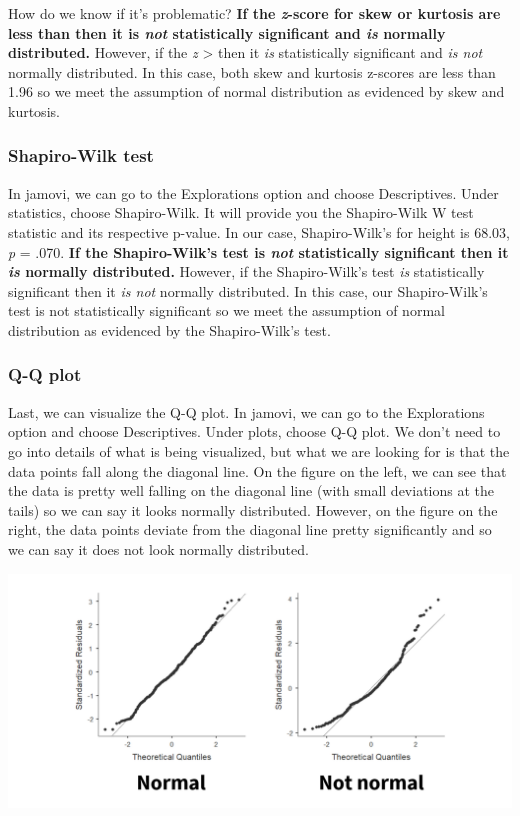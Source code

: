 \documentclass[
]{book}
\begin{document}
How do we know if it's problematic? \textbf{If the \emph{z}-score for skew or kurtosis are less than \textbar{} then it is \emph{not} statistically significant and \emph{is} normally distributed.} However, if the \emph{z} \textgreater{} \textbar{} then it \emph{is} statistically significant and \emph{is not} normally distributed. In this case, both skew and kurtosis z-scores are less than 1.96 so we meet the assumption of normal distribution as evidenced by skew and kurtosis.

\hypertarget{shapiro-wilk-test}{%
\subsubsection{Shapiro-Wilk test}\label{shapiro-wilk-test}}

In jamovi, we can go to the Explorations option and choose Descriptives. Under statistics, choose Shapiro-Wilk. It will provide you the Shapiro-Wilk W test statistic and its respective p-value. In our case, Shapiro-Wilk's for height is 68.03, \emph{p} = .070. \textbf{If the Shapiro-Wilk's test is \emph{not} statistically significant then it \emph{is} normally distributed.} However, if the Shapiro-Wilk's test \emph{is} statistically significant then it \emph{is not} normally distributed. In this case, our Shapiro-Wilk's test is not statistically significant so we meet the assumption of normal distribution as evidenced by the Shapiro-Wilk's test.

\hypertarget{q-q-plot}{%
\subsubsection{Q-Q plot}\label{q-q-plot}}

Last, we can visualize the Q-Q plot. In jamovi, we can go to the Explorations option and choose Descriptives. Under plots, choose Q-Q plot. We don't need to go into details of what is being visualized, but what we are looking for is that the data points fall along the diagonal line. On the figure on the left, we can see that the data is pretty well falling on the diagonal line (with small deviations at the tails) so we can say it looks normally distributed. However, on the figure on the right, the data points deviate from the diagonal line pretty significantly and so we can say it does not look normally distributed.

\includegraphics{images/06-inferential/qqplot.png}
\end{document}

